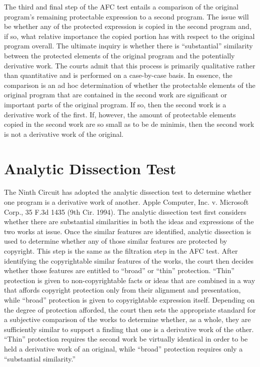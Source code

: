 The third and final step of the AFC test entails a comparison of the
original program's remaining protectable expression to a second
program. The issue will be whether any of the protected expression is
copied in the second program and, if so, what relative importance the
copied portion has with respect to the original program overall. The
ultimate inquiry is whether there is ``substantial'' similarity between
the protected elements of the original program and the potentially
derivative work. The courts admit that this process is primarily
qualitative rather than quantitative and is performed on a case-by-case
basis. In essence, the comparison is an ad hoc determination of whether
the protectable elements of the original program that are contained in the
second work are significant or important parts of the original program. If
so, then the second work is a derivative work of the first. If, however,
the amount of protectable elements copied in the second work are so small
as to be de minimis, then the second work is not a derivative work of the
original.

\section{Analytic Dissection Test}

The Ninth Circuit has adopted the analytic dissection test to determine
whether one program is a derivative work of another. Apple Computer,
Inc. v. Microsoft Corp., 35 F.3d 1435 (9th Cir. 1994). The analytic
dissection test first considers whether there are substantial similarities
in both the ideas and expressions of the two works at issue. Once the
similar features are identified, analytic dissection is used to determine
whether any of those similar features are protected by copyright. This
step is the same as the filtration step in the AFC test. After identifying
the copyrightable similar features of the works, the court then decides
whether those features are entitled to ``broad'' or ``thin''
protection. ``Thin'' protection is given to non-copyrightable facts or
ideas that are combined in a way that affords copyright protection only
from their alignment and presentation, while ``broad'' protection is given
to copyrightable expression itself. Depending on the degree of protection
afforded, the court then sets the appropriate standard for a subjective
comparison of the works to determine whether, as a whole, they are
sufficiently similar to support a finding that one is a derivative work of
the other. ``Thin'' protection requires the second work be virtually
identical in order to be held a derivative work of an original, while
``broad'' protection requires only a ``substantial similarity.''

